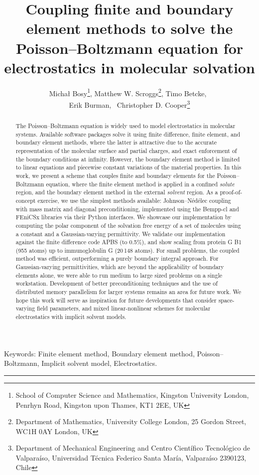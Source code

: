 \documentclass[12pt]{article}
\title{Coupling finite and boundary element methods to solve the Poisson--Boltzmann equation for electrostatics in molecular solvation}
\author{Micha\l{} Bosy\thanks{School of Computer Science and Mathematics, Kingston University London, Penrhyn Road, Kingston upon Thames, KT1 2EE, UK}, 
    Matthew W. Scroggs\thanks{Department of Mathematics, University College London, 25 Gordon Street, WC1H 0AY London, UK}, 
    Timo Betcke\footnotemark[2],~\\%
    Erik Burman\footnotemark[2],~%
    Christopher D. Cooper\thanks{Department of Mechanical Engineering and Centro Cient\'ifico Tecnol\'ogico de Valpara\'iso, Universidad T\'ecnica Federico Santa Mar\'ia, Valpara\'iso 2390123, Chile}}
\newenvironment{wileykeywords}{\textsf{Keywords:}\hspace{\stretch{1}}}{\hspace{\stretch{1}}\rule{1ex}{1ex}}
\begin{document}
\maketitle


\begin{abstract}
The Poisson--Boltzmann equation is widely used to model electrostatics in molecular systems. Available software packages solve it using finite difference, finite element, and boundary element methods, where the latter is attractive due to the accurate representation of the molecular surface and partial charges, and exact enforcement of the boundary conditions at infinity. However, the boundary element method is limited to linear equations and piecewise constant variations of the material properties. In this work, we present a scheme that couples finite and boundary elements for the Poisson--Boltzmann equation, where the finite element method is applied in a confined {\it solute} region, and the boundary element method in the external {\it solvent} region. As a proof-of-concept exercise, we use the simplest methods available: Johnson--N\'ed\'elec coupling with mass matrix and diagonal preconditioning, implemented using the Bempp-cl and FEniCSx libraries via their Python interfaces. We showcase our implementation by computing the polar component of the solvation free energy of a set of molecules using a constant and a Gaussian-varying permittivity. We validate our implementation against the finite difference code APBS (to 0.5\%), and show scaling from protein G B1 (955 atoms) up to immunoglobulin G (20\,148 atoms). For small problems, the coupled method was efficient, outperforming a purely boundary integral approach. For Gaussian-varying permittivities, which are beyond the applicability of boundary elements alone, we were able to run medium to large sized problems on a single workstation. Development of better preconditioning techniques and the use of distributed memory parallelism for larger systems remains an area for future work. We hope this work will serve as inspiration for future developments that consider space-varying field parameters, and mixed linear-nonlinear schemes for molecular electrostatics with implicit solvent models. 
\end{abstract}

\begin{wileykeywords}
Finite element method, Boundary element method, Poisson--Boltzmann, Implicit solvent model, Electrostatics.
\end{wileykeywords}
\end{document}
